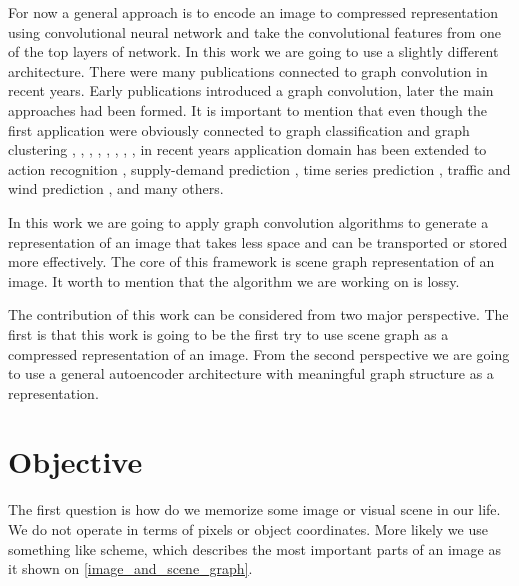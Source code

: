 For now a general approach is to encode an image to compressed representation using convolutional neural network and take the convolutional features from one of the top layers of network. In this work we are going to use a slightly different architecture. There were many publications connected to graph convolution in recent years. Early publications introduced a graph convolution, later the main approaches had been formed. It is important to mention that even though the first application were obviously connected to graph classification and graph clustering \cite{Kipf_Welling_2017}, \cite{Defferrard_Bresson_Vandergheynst_2017}, \cite{Fey_Lenssen_Weichert_Muller_2018}, \cite{Hamilton_Ying_Leskovec_2017}, \cite{Hamilton_Ying_Leskovec_2018}, \cite{Monti_Boscaini_Masci_Rodolà_Svoboda_Bronstein_2017}, \cite{Monti_Otness_Bronstein_2018}, \cite{Velicković_Cucurull_Casanova_Romero_Liò_Bengio_2017}, in recent years application domain has been extended to action recognition \cite{Cheng_Zhang_He_Chen_Cheng_Lu_2020}, supply-demand prediction \cite{Jin_Xia_Liu_Murata_Kim_2021}, time series prediction \cite{Cheng_Zhang_He_Chen_Cheng_Lu_2020}, traffic and wind prediction \cite{Cui_Henrickson_Ke_Wang_2020}, \cite{Stańczyk_Mehrkanoon_2021} and many others.

In this work we are going to apply graph convolution algorithms to generate a representation of an image that takes less space and can be transported or stored more effectively. The core of this framework is scene graph representation of an image. It worth to mention that the algorithm we are working on is lossy.

The contribution of this work can be considered from two major perspective. The first is that this work is going to be the first try to use scene graph as a compressed representation of an image. From the second perspective we are going to use a general autoencoder architecture with meaningful graph structure as a representation.

\chapter{Objective}

The first question is how do we memorize some image or visual scene in our life. We do not operate in terms of pixels or object coordinates. More likely we use something like scheme, which describes the most important parts of an image as it shown on \ref{image_and_scene_graph}.

